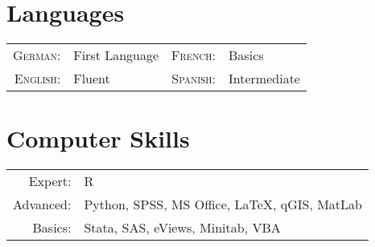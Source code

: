 \documentclass[a4paper,10pt]{article} %
\begin{document}

\section{Languages}

\begin{tabular}{rlrl}
\textsc{German:} & First Language & \textsc{French:} & Basics\\
\textsc{English:} & Fluent &\textsc{Spanish:}& Intermediate\\
\end{tabular}

\section{Computer Skills}
\begin{tabular}{rl}
	Expert: & R \\
	
	Advanced: & Python, SPSS, MS Office, LaTeX, qGIS, MatLab\\
	
Basics: & Stata, SAS, eViews, Minitab, VBA




\end{tabular}



\end{document}
